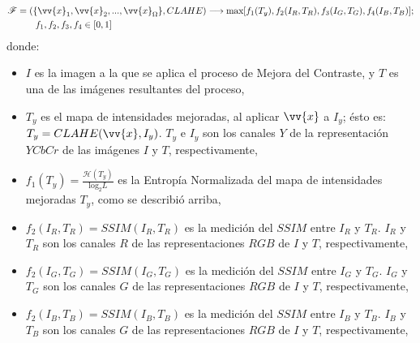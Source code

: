 \begin{equation}
\begin{split}
\mathscr{F} &= (\{\vv{x}_1, \vv{x}_2,...,\vv{x}_{\Omega}\},CLAHE) \longrightarrow \text{max}[f_1(T_y),f_2(I_R,T_R),f_3(I_G,T_G),f_4(I_B,T_B)]; \\
            & \qquad f_1,f_2,f_3,f_4 \in [0,1]
\end{split}
\end{equation}
donde:


\begin{itemize}
        \item $I$ es la imagen a la que se aplica el proceso de Mejora del Contraste, y $T$\label{symbol:imejorada} es una de las imágenes resultantes del proceso,
	\item $T_y$ es el mapa de intensidades mejoradas, al aplicar $\vv{x}$ a $I_y$; ésto es: $T_y=CLAHE(\vv{x},I_y\label{symbol:ioriginaly})$. $T_y$ e $I_y$ son los canales $Y$ de la representación $YCbCr$  de las imágenes $I$ y $T$, respectivamente,
	\item $f_1(T_y)\label{symbol:imejoraday}=\frac{\mathscr{H}(T_y)}{\text{log}_2L}$ es la Entropía Normalizada del mapa de intensidades mejoradas $T_y$, como se describió arriba,
	\item $f_2(I_R\label{symbol:ioriginalr},T_R\label{symbol:imejoradar})=SSIM(I_R,T_R)$ es la medición del $SSIM$ entre $I_R$ y $T_R$. $I_R$ y $T_R$ son los canales $R$ de las representaciones $RGB$ de $I$ y $T$, respectivamente,
	\item $f_2(I_G\label{symbol:ioriginalg},T_G\label{symbol:imejoradag})=SSIM(I_G,T_G)$ es la medición del $SSIM$ entre $I_G$ y $T_G$. $I_G$ y $T_G$ son los canales $G$ de las representaciones $RGB$ de $I$ y $T$, respectivamente,
	\item $f_2(I_B\label{symbol:ioriginalb},T_B\label{symbol:imejoradab})=SSIM(I_B,T_B)$ es la medición del $SSIM$ entre $I_B$ y $T_B$. $I_B$ y $T_B$ son los canales $G$ de las representaciones $RGB$ de $I$ y $T$, respectivamente,
\end{itemize}

